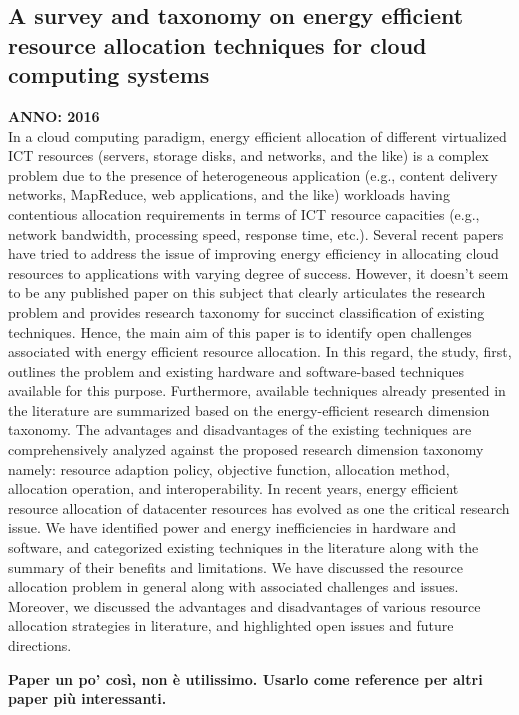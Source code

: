 \subsection{A survey and taxonomy on energy efficient resource allocation techniques for cloud computing systems}
\textbf{ANNO: 2016}~\cite{hameed2016survey}\\
In a cloud computing paradigm, energy efficient allocation of different virtualized ICT resources 
(servers, storage disks, and networks, and the like) is a complex problem due to the presence of heterogeneous application 
(e.g., content delivery networks, MapReduce, web applications, and the like) workloads having contentious
allocation requirements in terms of ICT resource capacities (e.g., network bandwidth,
processing speed, response time, etc.). Several recent papers have tried to address
the issue of improving energy efficiency in allocating cloud resources to applications
with varying degree of success. However, it doesn't seem to be any published paper on this subject that clearly 
articulates the research problem and provides research taxonomy for succinct classification of existing techniques. 
Hence, the main aim of this paper is to identify open challenges associated 
with energy efficient resource allocation. 
In this regard, the study, first, outlines the problem and existing hardware and software-based techniques available for this purpose. 
Furthermore, available techniques already presented in the literature are summarized based
on the energy-efficient research dimension taxonomy. 
The advantages and disadvantages of the existing techniques are comprehensively analyzed against the proposed
research dimension taxonomy namely: resource adaption policy, objective function,
allocation method, allocation operation, and interoperability.
In recent years, energy efficient resource allocation of datacenter resources has evolved
as one the critical research issue. We have identified power and energy inefficiencies in
hardware and software, and categorized existing techniques in the literature along with
the summary of their benefits and limitations. We have discussed the resource allocation problem in general along 
with associated challenges and issues. 
Moreover, we discussed the advantages and disadvantages of various resource allocation strategies
in literature, and highlighted open issues and future directions.

\textbf{Paper un po' così, non è utilissimo. Usarlo come reference per altri paper più interessanti.}


